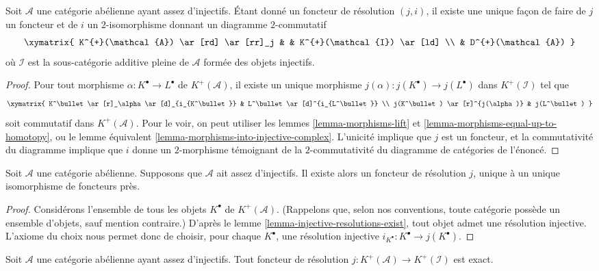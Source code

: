 \begin{lemma}
\label{lemma-resolution-functor}
Soit $\mathcal{A}$ une catégorie abélienne ayant assez d'injectifs.
Étant donné un foncteur de résolution $(j, i)$, il existe une unique façon
de faire de $j$ un foncteur et de $i$ un $2$-isomorphisme donnant un diagramme
$2$-commutatif
$$
\xymatrix{
K^{+}(\mathcal{A}) \ar[rd] \ar[rr]_j & & K^{+}(\mathcal{I}) \ar[ld] \\
& D^{+}(\mathcal{A})
}
$$
où $\mathcal{I}$ est la sous-catégorie additive pleine de $\mathcal{A}$
formée des objets injectifs.
\end{lemma}

\begin{proof}
Pour tout morphisme $\alpha : K^\bullet \to L^\bullet$ de
$K^{+}(\mathcal{A})$, il existe un unique morphisme
$j(\alpha) : j(K^\bullet) \to j(L^\bullet)$ dans $K^{+}(\mathcal{I})$ tel que
$$
\xymatrix{
K^\bullet \ar[r]_\alpha \ar[d]_{i_{K^\bullet}} &
L^\bullet \ar[d]^{i_{L^\bullet}} \\
j(K^\bullet) \ar[r]^{j(\alpha)} & j(L^\bullet)
}
$$
soit commutatif dans $K^{+}(\mathcal{A})$. Pour le voir, on peut utiliser les
lemmes \ref{lemma-morphisms-lift} et
\ref{lemma-morphisms-equal-up-to-homotopy}, ou le
lemme équivalent \ref{lemma-morphisms-into-injective-complex}.
L'unicité implique que $j$ est un foncteur, et la commutativité du diagramme
implique que $i$ donne un $2$-morphisme témoignant de la $2$-commutativité du
diagramme de catégories de l'énoncé.
\end{proof}

\begin{lemma}
\label{lemma-into-derived-category}
Soit $\mathcal{A}$ une catégorie abélienne.
Supposons que $\mathcal{A}$ ait assez d'injectifs.
Il existe alors un foncteur de résolution $j$, unique à un unique
isomorphisme de foncteurs près.
\end{lemma}

\begin{proof}
Considérons l'ensemble de tous les objets $K^\bullet$ de
$K^{+}(\mathcal{A})$. (Rappelons que, selon nos conventions, toute catégorie
possède un ensemble d'objets, sauf mention contraire.) D'après le
lemme \ref{lemma-injective-resolutions-exist}, tout objet admet une résolution
injective. L'axiome du choix nous permet donc de choisir, pour chaque
$K^\bullet$, une résolution injective
$i_{K^\bullet} : K^\bullet \to j(K^\bullet)$.
\end{proof}

\begin{lemma}
\label{lemma-j-is-exact}
Soit $\mathcal{A}$ une catégorie abélienne ayant assez d'injectifs.
Tout foncteur de résolution
$j : K^{+}(\mathcal{A}) \to K^{+}(\mathcal{I})$ est exact.
\end{lemma}

